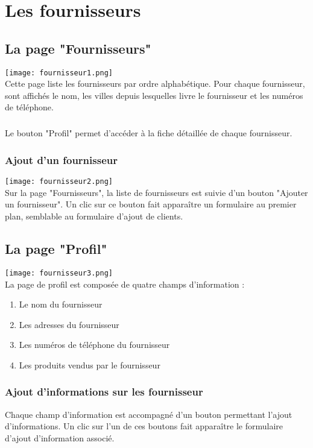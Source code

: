 \chapter{Les fournisseurs}

\section{La page "Fournisseurs"}
\texttt{[image: fournisseur1.png]}\\
Cette page liste les fournisseurs par ordre alphabétique. Pour chaque fournisseur, sont
affichés le nom, les villes depuis lesquelles livre le fournisseur et
les numéros de téléphone.

\paragraph{}
Le bouton "Profil" permet d'accéder à la fiche détaillée de chaque fournisseur.

\subsection{Ajout d'un fournisseur}
\texttt{[image: fournisseur2.png]}\\
Sur la page "Fournisseurs", la liste de fournisseurs est suivie d'un bouton
"Ajouter un fournisseur". Un clic sur ce bouton fait apparaître un formulaire au
premier plan, semblable au formulaire d'ajout de clients.

\section{La page "Profil"}
\texttt{[image: fournisseur3.png]}\\
La page de profil est composée de quatre champs d'information :

\begin{enumerate}
  \item Le nom du fournisseur
  \item Les adresses du fournisseur
  \item Les numéros de téléphone du fournisseur
  \item Les produits vendus par le fournisseur
\end{enumerate}

\subsection{Ajout d'informations sur les fournisseur}
Chaque champ d'information est accompagné d'un bouton permettant l'ajout d'informations.
Un clic sur l'un de ces boutons fait apparaître le formulaire d'ajout
d'information associé.

